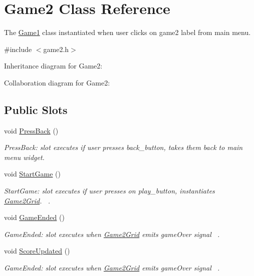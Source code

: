 \hypertarget{classGame2}{}\section{Game2 Class Reference}
\label{classGame2}


The \hyperlink{classGame1}{Game1} class instantiated when user clicks on game2 label from main menu.  




{\ttfamily \#include $<$game2.\+h$>$}



Inheritance diagram for Game2\+:


Collaboration diagram for Game2\+:
\subsection*{Public Slots}
\begin{DoxyCompactItemize}
\item 
void \hyperlink{classGame2_a06e537364fffde28c04697db4855ade0}{Press\+Back} ()
\begin{DoxyCompactList}\small\item\em Press\+Back\+: slot executes if user presses back\+\_\+button, takes them back to main menu widget. \end{DoxyCompactList}\item 
void \hyperlink{classGame2_a2f51124a2ec3758fbc1bfd056ca137b6}{Start\+Game} ()
\begin{DoxyCompactList}\small\item\em Start\+Game\+: slot executes if user presses on play\+\_\+button, instantiates \hyperlink{classGame2Grid}{Game2\+Grid}.~\newline
. \end{DoxyCompactList}\item 
void \hyperlink{classGame2_a39a8191a0c66453ed1070db56415f2a9}{Game\+Ended} ()
\begin{DoxyCompactList}\small\item\em Game\+Ended\+: slot executes when \hyperlink{classGame2Grid}{Game2\+Grid} emits game\+Over signal~\newline
. \end{DoxyCompactList}\item 
void \hyperlink{classGame2_adea8085cc1e37f1103f7efabc0fe8244}{Score\+Updated} ()
\begin{DoxyCompactList}\small\item\em Game\+Ended\+: slot executes when \hyperlink{classGame2Grid}{Game2\+Grid} emits game\+Over signal~\newline
. \end{DoxyCompactList}\end{DoxyCompactItemize}
